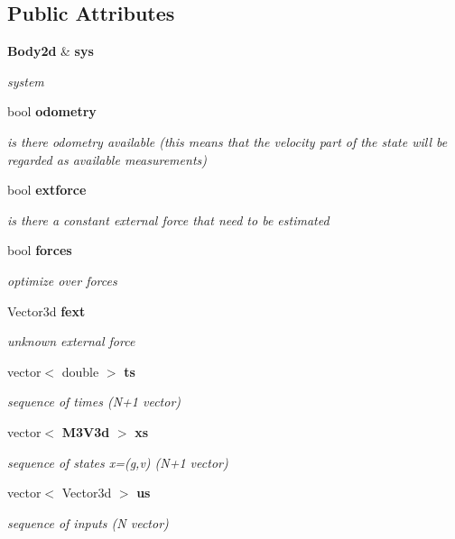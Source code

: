 \subsection*{\-Public \-Attributes}
\begin{DoxyCompactItemize}
\item 
{\bf \-Body2d} \& {\bf sys}
\begin{DoxyCompactList}\small\item\em system \end{DoxyCompactList}\item 
bool {\bf odometry}
\begin{DoxyCompactList}\small\item\em is there odometry available (this means that the velocity part of the state will be regarded as available measurements) \end{DoxyCompactList}\item 
bool {\bf extforce}
\begin{DoxyCompactList}\small\item\em is there a constant external force that need to be estimated \end{DoxyCompactList}\item 
bool {\bf forces}
\begin{DoxyCompactList}\small\item\em optimize over forces \end{DoxyCompactList}\item 
\-Vector3d {\bf fext}
\begin{DoxyCompactList}\small\item\em unknown external force \end{DoxyCompactList}\item 
vector$<$ double $>$ {\bf ts}
\begin{DoxyCompactList}\small\item\em sequence of times (\-N+1 vector) \end{DoxyCompactList}\item 
vector$<$ {\bf \-M3\-V3d} $>$ {\bf xs}
\begin{DoxyCompactList}\small\item\em sequence of states x=(g,v) (\-N+1 vector) \end{DoxyCompactList}\item 
vector$<$ \-Vector3d $>$ {\bf us}
\begin{DoxyCompactList}\small\item\em sequence of inputs (\-N vector) \end{DoxyCompactList}\item 

\end{DoxyCompactItemize}

